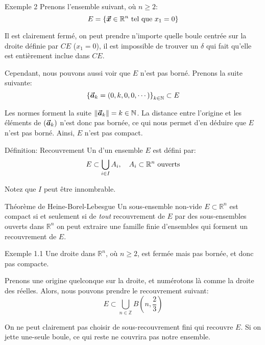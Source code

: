 \documentclass[a4paper]{article}
\begin{document}
\begin{parag}{Exemple 2}
    Prenons l'ensemble suivant, où $n \geq 2$: 
    \[E = \left\{\bvec{x} \in \mathbb{R}^n \telque x_1 = 0\right\}\]

    Il est clairement fermé, on peut prendre n'importe quelle boule centrée sur la droite définie par $CE$ ($x_1 = 0$), il est impossible de trouver un $\delta$ qui fait qu'elle est entièrement inclue dans $CE$.

    Cependant, nous pouvons aussi voir que $E$ n'est pas borné. Prenons la suite suivante: 
    \[\left\{\bvec{a}_k = \left(0, k, 0, 0, \cdots\right)\right\}_{k \in \mathbb{N}} \subset E\]
    
    Les normes forment la suite $\left\|\bvec{a}_k\right\| = k \in \mathbb{N}$. La distance entre l'origine et les éléments de $\left(\bvec{a}_k\right)$ n'est donc pas bornée, ce qui nous permet d'en déduire que $E$ n'est pas borné. Ainsi, $E$ n'est pas compact.
\end{parag}

\begin{parag}{Définition: Recouvrement}
    Un  d'un ensemble $E$ est défini par: 
    \[E \subset \bigcup_{i \in I} A_i, \quad A_i \subset \mathbb{R}^n \text{ ouverts}\]

    Notez que $I$ peut être innombrable.

\end{parag}


\begin{parag}{Théorème de Heine-Borel-Lebesgue}
    Un sous-ensemble non-vide $E \subset \mathbb{R}^n$ est compact si et seulement si de \textit{tout} recouvrement de $E$ par des sous-ensembles ouverts dans $\mathbb{R}^n$ on peut extraire une famille finie d'ensembles qui forment un recouvrement de $E$.
\end{parag}

\begin{parag}{Exemple 1.1}
    Une droite dans $\mathbb{R}^n$, où $n \geq 2$, est fermée mais pas bornée, et donc pas compacte.

    Prenons une origine quelconque sur la droite, et numérotons là comme la droite des réelles. Alors, nous pouvons prendre le recouvrement suivant: 
    \[E \subset \bigcup_{n \in \mathbb{Z}} B\left(n, \frac{2}{3}\right)\]

    
    On ne peut clairement pas choisir de sous-recouvrement fini qui recouvre $E$. Si on jette une-seule boule, ce qui reste ne couvrira pas notre ensemble.
\end{parag}
\end{document}
